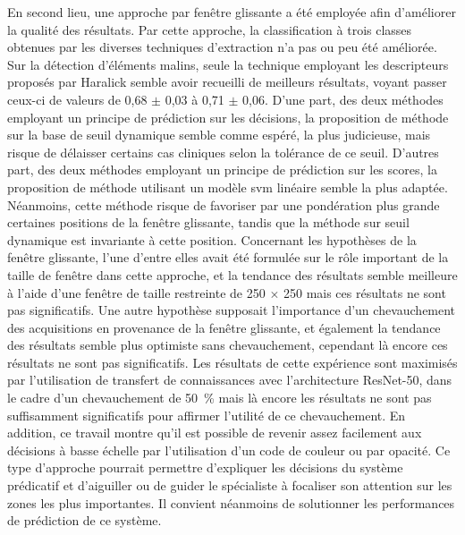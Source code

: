 En second lieu, une approche par fenêtre glissante a été employée afin d'améliorer la qualité des résultats. Par cette approche, la classification à trois classes obtenues par les diverses techniques d'extraction n'a pas ou peu été améliorée. Sur la détection d'éléments malins, seule la technique employant les descripteurs proposés par Haralick semble avoir recueilli de meilleurs résultats, voyant passer ceux-ci de valeurs de \fscore{} 0,68 $\pm$ 0,03 à 0,71 $\pm$ 0,06. D'une part, des deux méthodes employant un principe de prédiction sur les décisions, la proposition de méthode sur la base de seuil dynamique semble comme espéré, la plus judicieuse, mais risque de délaisser certains cas cliniques selon la tolérance de ce seuil. D'autres part, des deux méthodes employant un principe de prédiction sur les scores, la proposition de méthode utilisant un modèle \gls{svm} linéaire semble la plus adaptée. Néanmoins, cette méthode risque de favoriser par une pondération plus grande certaines positions de la fenêtre glissante, tandis que la méthode sur seuil dynamique est invariante à cette position. Concernant les hypothèses de la fenêtre glissante, l'une d'entre elles avait été formulée sur le rôle important de la taille de fenêtre dans cette approche, et la tendance des résultats semble meilleure à l'aide d’une fenêtre de taille restreinte de 250 $\times$ 250 mais ces résultats ne sont pas significatifs. Une autre hypothèse supposait l'importance d'un chevauchement des acquisitions en provenance de la fenêtre glissante, et également la tendance des résultats semble plus optimiste sans chevauchement, cependant là encore ces résultats ne sont pas significatifs. Les résultats de cette expérience sont maximisés par l'utilisation de transfert de connaissances avec l'architecture ResNet-50, dans le cadre d'un chevauchement de 50~\% mais là encore les résultats ne sont pas suffisamment significatifs pour affirmer l'utilité de ce chevauchement. En addition, ce travail montre qu'il est possible de revenir assez facilement aux décisions à basse échelle par l'utilisation d'un code de couleur ou par opacité. Ce type d'approche pourrait permettre d'expliquer les décisions du système prédicatif et d'aiguiller ou de guider le spécialiste à focaliser son attention sur les zones les plus importantes. Il convient néanmoins de solutionner les performances de prédiction de ce système.\par 

